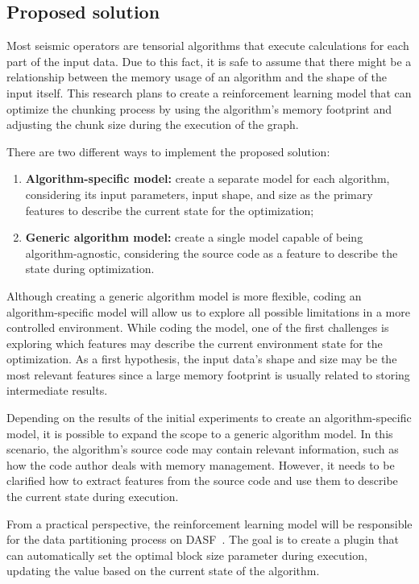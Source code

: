 \subsection{Proposed solution}
\label{subsec:proposed-solution}

Most seismic operators are tensorial algorithms that execute calculations for each part of the input data.
Due to this fact, it is safe to assume that there might be a relationship between the memory usage of an algorithm and the shape of the input itself.
This research plans to create a reinforcement learning model that can optimize the chunking process by using the algorithm's memory footprint and adjusting the chunk size during the execution of the graph.

There are two different ways to implement the proposed solution:

\begin{enumerate}
  \item \textbf{Algorithm-specific model:} create a separate model for each algorithm, considering its input parameters, input shape, and size as the primary features to describe the current state for the optimization;
  \item \textbf{Generic algorithm model:} create a single model capable of being algorithm-agnostic, considering the source code as a feature to describe the state during optimization.
\end{enumerate}

Although creating a generic algorithm model is more flexible, coding an algorithm-specific model will allow us to explore all possible limitations in a more controlled environment.
While coding the model, one of the first challenges is exploring which features may describe the current environment state for the optimization.
As a first hypothesis, the input data's shape and size may be the most relevant features since a large memory footprint is usually related to storing intermediate results.

Depending on the results of the initial experiments to create an algorithm-specific model, it is possible to expand the scope to a generic algorithm model.
In this scenario, the algorithm's source code may contain relevant information, such as how the code author deals with memory management.
However, it needs to be clarified how to extract features from the source code and use them to describe the current state during execution.

From a practical perspective, the reinforcement learning model will be responsible for the data partitioning process on \ac{DASF}~\cite{dasf}.
The goal is to create a plugin that can automatically set the optimal block size parameter during execution, updating the value based on the current state of the algorithm.

